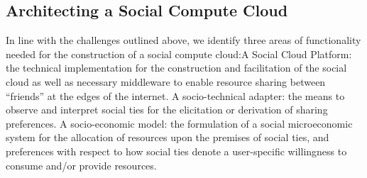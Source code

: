 \documentclass[a4paper,12pt]{article}
\begin{document}
	\subsection{ \textbf{Architecting a Social Compute Cloud}}
In line with the challenges outlined above, we identify three
areas of functionality needed for the construction of a social
compute cloud:A Social Cloud Platform: the technical implementation for the construction and facilitation of the social
cloud as well as necessary middleware to enable resource
sharing between “friends” at the edges of the internet. A
socio-technical adapter: the means to observe and interpret
social ties for the elicitation or derivation of sharing preferences. A socio-economic model: the formulation of a social
microeconomic system for the allocation of resources upon
the premises of social ties, and preferences with respect to
how social ties denote a user-specific willingness to consume and/or provide resources.
\end{document}
